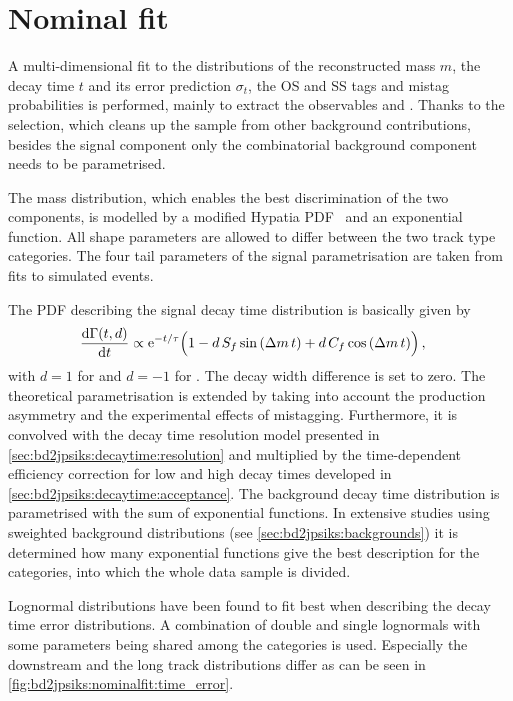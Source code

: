 
\section{Nominal fit}
\label{sec:bd2jpsiks:nominalfit}

A multi-dimensional fit to the distributions of the reconstructed mass $m$,
the decay time $t$ and its error prediction $\sigma_t$, the OS and SS\pion
tags and mistag probabilities is performed, mainly to extract the \CP
observables \SJpsiKS and \CJpsiKS. Thanks to the selection, which cleans up
the sample from other background contributions, besides the signal component
only the combinatorial background component needs to be parametrised.

The mass distribution, which enables the best discrimination of the two
components, is modelled by a modified Hypatia PDF~\cite{Santos:2013ky} and an
exponential function. All shape parameters are allowed to differ between the two
track type categories. The four tail parameters of the signal parametrisation
are taken from fits to simulated events.

The PDF describing the signal decay time distribution is basically given by
\begin{equation}
\begin{aligned}
  \frac{\mathrm{d}\Gamma(t,d)}{\mathrm{d}t}
  &\propto \mathrm{e}^{-t/\tau}
    \Big(
      1
      - d\, \Sf \sin{\left(\dm\,t\right)}
      + d\, \Cf \cos{\left(\dm\,t\right)}
    \Big)\,,
\end{aligned}
\label{eq:simpledecayrates}
\end{equation}
with $d = \num{+1}$ for \Bd and $d = \num{-1}$ for \Bdb. The decay width
difference \DGd is set to zero. The theoretical parametrisation is extended by
taking into account the production asymmetry and the experimental effects of
mistagging. Furthermore, it is convolved with the decay time resolution model
presented in \cref{sec:bd2jpsiks:decaytime:resolution} and multiplied by the
time-dependent efficiency correction for low and high decay times developed in
\cref{sec:bd2jpsiks:decaytime:acceptance}. The background decay time
distribution is parametrised with the sum of exponential functions.
In extensive studies using sweighted background distributions (see
\cref{sec:bd2jpsiks:backgrounds}) it is determined how many exponential
functions give the best description for the categories, into which the whole
data sample is divided.

Lognormal distributions have been found to fit best when describing the decay
time error distributions. A combination of double and single lognormals with
some parameters being shared among the categories is used. Especially the
downstream and the long track distributions differ as can be seen in
\cref{fig:bd2jpsiks:nominalfit:time_error}.

